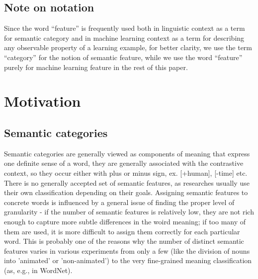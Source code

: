 \documentclass[letterpaper]{article}
\newcommand{\todofn}[1] {
 \footnote{\textbf{TODO : #1}}}
\begin{document}


\subsection{Note on notation}
Since the word ``feature'' is frequently used both in linguistic context as a term for semantic category and in 
machine learning context as a term for describing any observable property of a learning example, for 
better clarity, we use the term ``category'' for the notion of semantic feature, 
while we use the word ``feature'' purely for machine learning feature in the rest of this paper.


\section{Motivation}
\subsection{Semantic categories}
Semantic categories are generally viewed as components of meaning
that express one definite sense of a word, they are generally associated
with the contrastive context, so they occur either with plus or minus
sign, ex. [+human], [-time] etc. 
There is no generally accepted set of semantic features, as researches
usually use their own classification depending on their goals. Assigning 
semantic features to concrete words is influenced by a general issue 
of finding the proper level of granularity - if the number of semantic features is relatively 
low, they are not rich enough to capture more subtle differences in the woird meaning;
if too many of them are used, it is more difficult to assign them correctly
for each particular word. This is probably one of the reasons why the 
number of distinct semantic features varies in various experiments 
from only a few (like
the division of nouns into 'animated' or 'non-animated') to the very
fine-grained meaning classification (as, e.g., in WordNet).
\end{document}
